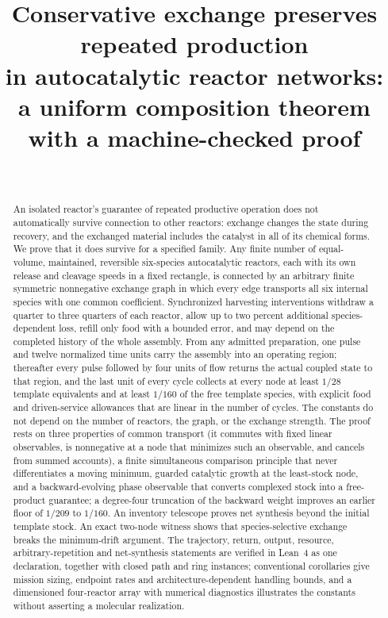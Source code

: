 \documentclass[11pt,a4paper]{article}
\title{Conservative exchange preserves repeated production\\ in autocatalytic reactor networks:\\[4pt]
\large a uniform composition theorem with a machine-checked proof}
\author{\PaperAuthor\\ \small \PaperAffiliation}
\date{\PaperDate}
\theoremstyle{plain}
\theoremstyle{definition}
\theoremstyle{remark}
\begin{document}
\maketitle

\begin{abstract}
An isolated reactor's guarantee of repeated productive operation does not automatically survive connection to other reactors: exchange changes the state during recovery, and the exchanged material includes the catalyst in all of its chemical forms. We prove that it does survive for a specified family. Any finite number of equal-volume, maintained, reversible six-species autocatalytic reactors, each with its own release and cleavage speeds in a fixed rectangle, is connected by an arbitrary finite symmetric nonnegative exchange graph in which every edge transports all six internal species with one common coefficient. Synchronized harvesting interventions withdraw a quarter to three quarters of each reactor, allow up to two percent additional species-dependent loss, refill only food with a bounded error, and may depend on the completed history of the whole assembly. From any admitted preparation, one pulse and twelve normalized time units carry the assembly into an operating region; thereafter every pulse followed by four units of flow returns the actual coupled state to that region, and the last unit of every cycle collects at every node at least $1/28$ template equivalents and at least $1/160$ of the free template species, with explicit food and driven-service allowances that are linear in the number of cycles. The constants do not depend on the number of reactors, the graph, or the exchange strength. The proof rests on three properties of common transport (it commutes with fixed linear observables, is nonnegative at a node that minimizes such an observable, and cancels from summed accounts), a finite simultaneous comparison principle that never differentiates a moving minimum, guarded catalytic growth at the least-stock node, and a backward-evolving phase observable that converts complexed stock into a free-product guarantee; a degree-four truncation of the backward weight improves an earlier floor of $1/209$ to $1/160$. An inventory telescope proves net synthesis beyond the initial template stock. An exact two-node witness shows that species-selective exchange breaks the minimum-drift argument. The trajectory, return, output, resource, arbitrary-repetition and net-synthesis statements are verified in Lean~4 as one declaration, together with closed path and ring instances; conventional corollaries give mission sizing, endpoint rates and architecture-dependent handling bounds, and a dimensioned four-reactor array with numerical diagnostics illustrates the constants without asserting a molecular realization.
\end{abstract}
\end{document}
